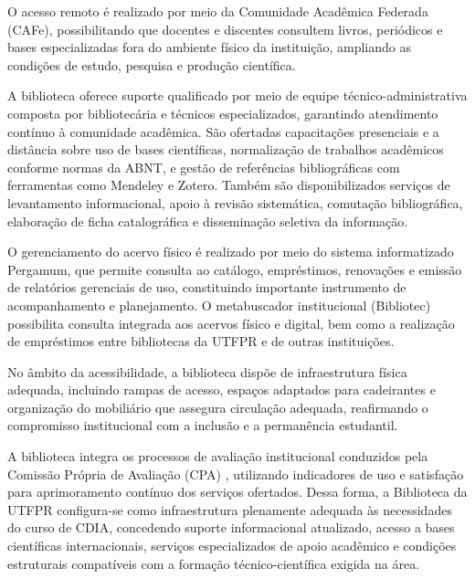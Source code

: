 O acesso remoto é realizado por meio da Comunidade Acadêmica Federada (CAFe), possibilitando que docentes e discentes consultem livros, periódicos e bases especializadas fora do ambiente físico da instituição, ampliando as condições de estudo, pesquisa e produção científica.

A biblioteca oferece suporte qualificado por meio de equipe técnico-administrativa composta por bibliotecária e técnicos especializados, garantindo atendimento contínuo à comunidade acadêmica. São ofertadas capacitações presenciais e a distância sobre uso de bases científicas, normalização de trabalhos acadêmicos conforme normas da ABNT, e gestão de referências bibliográficas com ferramentas como Mendeley e Zotero. Também são disponibilizados serviços de levantamento informacional, apoio à revisão sistemática, comutação bibliográfica, elaboração de ficha catalográfica e disseminação seletiva da informação.

O gerenciamento do acervo físico é realizado por meio do sistema informatizado Pergamum, que permite consulta ao catálogo, empréstimos, renovações e emissão de relatórios gerenciais de uso, constituindo importante instrumento de acompanhamento e planejamento. O metabuscador institucional (Bibliotec) possibilita consulta integrada aos acervos físico e digital, bem como a realização de empréstimos entre bibliotecas da UTFPR e de outras instituições.

No âmbito da acessibilidade, a biblioteca dispõe de infraestrutura física adequada, incluindo rampas de acesso, espaços adaptados para cadeirantes e organização do mobiliário que assegura circulação adequada, reafirmando o compromisso institucional com a inclusão e a permanência estudantil.

A biblioteca integra os processos de avaliação institucional conduzidos pela Comissão Própria de Avaliação (CPA) \cite{UTFPR_CPA_2004, UTFPR_CPA_2009}, utilizando indicadores de uso e satisfação para aprimoramento contínuo dos serviços ofertados. Dessa forma, a Biblioteca da UTFPR configura-se como infraestrutura plenamente adequada às necessidades do curso de CDIA, concedendo suporte informacional atualizado, acesso a bases científicas internacionais, serviços especializados de apoio acadêmico e condições estruturais compatíveis com a formação técnico-científica exigida na área.